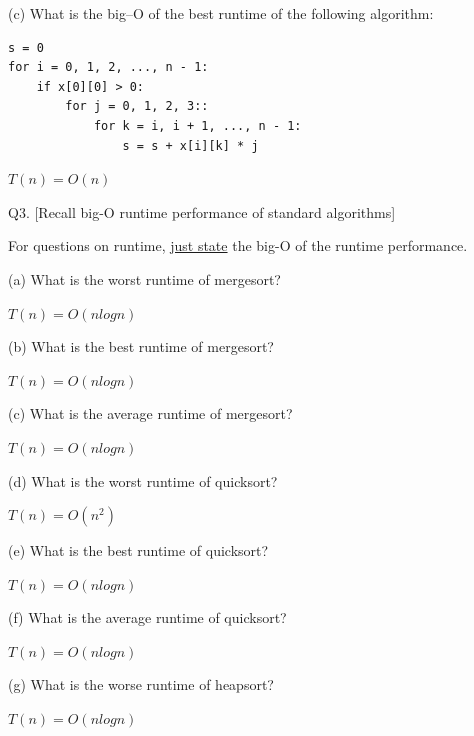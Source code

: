 (c)
What is the big--O of the best runtime of the following algorithm:
\begin{Verbatim}[frame=single]
s = 0
for i = 0, 1, 2, ..., n - 1:
    if x[0][0] > 0:
        for j = 0, 1, 2, 3::
            for k = i, i + 1, ..., n - 1:
                s = s + x[i][k] * j
\end{Verbatim}
\ANSWER
\begin{answerlong}
$T(n) = O(n)$
\end{answerlong}

\newpage
Q3. [Recall big-O runtime performance of standard algorithms]

For questions on runtime,
\underline{just state} the big-O of the runtime performance.


(a) What is the worst runtime of mergesort?
\\
\ANSWER
\begin{answerlong}
$T(n) = O(nlogn)$
\end{answerlong}
  
(b) What is the best runtime of mergesort?
\\
\ANSWER
\begin{answerlong}
$T(n) = O(nlogn)$
\end{answerlong}
  
(c) What is the average runtime of mergesort?
\\
\ANSWER
\begin{answerlong}
$T(n) = O(nlogn)$
\end{answerlong}
  
(d) What is the worst runtime of quicksort?
\\
\ANSWER
\begin{answerlong}
$T(n) = O(n^2)$
\end{answerlong}

(e) What is the best runtime of quicksort?
\\
\ANSWER
\begin{answerlong}
$T(n) = O(nlogn)$
\end{answerlong}

(f) What is the average runtime of quicksort?
\\
\ANSWER
\begin{answerlong}
$T(n) = O(nlogn)$
\end{answerlong}


(g) What is the worse runtime of heapsort?
\\
\ANSWER
\begin{answerlong}
$T(n) = O(nlogn)$
\end{answerlong}

